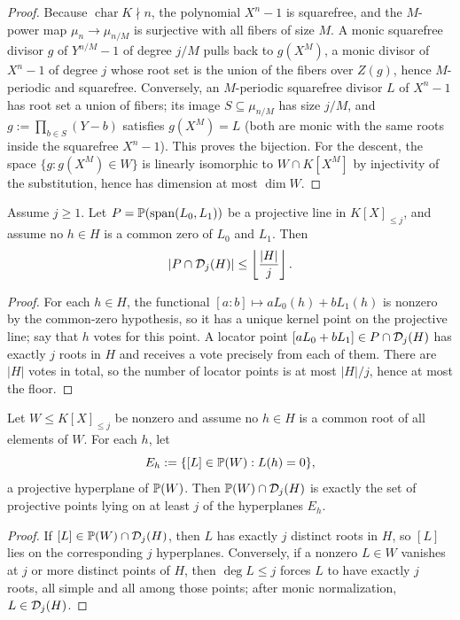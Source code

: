 \begin{proof}
Because $\operatorname{char}K\nmid n$, the polynomial $X^n-1$ is squarefree, and the $M$-power map $\mu_n\to\mu_{n/M}$ is surjective with all fibers of size $M$.  A monic squarefree divisor $g$ of $Y^{n/M}-1$ of degree $j/M$ pulls back to $g(X^M)$, a monic divisor of $X^n-1$ of degree $j$ whose root set is the union of the fibers over $Z(g)$, hence $M$-periodic and squarefree.  Conversely, an $M$-periodic squarefree divisor $L$ of $X^n-1$ has root set a union of fibers; its image $S\subseteq\mu_{n/M}$ has size $j/M$, and $g:=\prod_{b\in S}(Y-b)$ satisfies $g(X^M)=L$ \textup(both are monic with the same roots inside the squarefree $X^n-1$\textup).  This proves the bijection.  For the descent, the space $\{g:g(X^M)\in W\}$ is linearly isomorphic to $W\cap K[X^M]$ by injectivity of the substitution, hence has dimension at most $\dim W$.
\end{proof}

\begin{lemma}\label{lem:v13-dim1}
Assume $j\ge1$.  Let $P=\mathbb P(\operatorname{span}(L_0,L_1))$ be a projective line in $K[X]_{\le j}$, and assume no $h\in H$ is a common zero of $L_0$ and $L_1$.  Then
\[
        |P\cap\mathcal D_j(H)|\le\left\lfloor \frac{|H|}{j}\right\rfloor.
\]
\end{lemma}

\begin{proof}
For each $h\in H$, the functional $[a:b]\mapsto aL_0(h)+bL_1(h)$ is nonzero by the common-zero hypothesis, so it has a unique kernel point on the projective line; say that $h$ votes for this point.  A locator point $[aL_0+bL_1]\in P\cap\mathcal D_j(H)$ has exactly $j$ roots in $H$ and receives a vote precisely from each of them.  There are $|H|$ votes in total, so the number of locator points is at most $|H|/j$, hence at most the floor.
\end{proof}

\begin{lemma}\label{lem:v13-concurrency}
Let $W\le K[X]_{\le j}$ be nonzero and assume no $h\in H$ is a common root of all elements of $W$.  For each $h$, let
\[
        E_h:=\{[L]\in\mathbb P(W):L(h)=0\},
\]
a projective hyperplane of $\mathbb P(W)$.  Then $\mathbb P(W)\cap\mathcal D_j(H)$ is exactly the set of projective points lying on at least $j$ of the hyperplanes $E_h$.
\end{lemma}

\begin{proof}
If $[L]\in\mathbb P(W)\cap\mathcal D_j(H)$, then $L$ has exactly $j$ distinct roots in $H$, so $[L]$ lies on the corresponding $j$ hyperplanes.  Conversely, if a nonzero $L\in W$ vanishes at $j$ or more distinct points of $H$, then $\deg L\le j$ forces $L$ to have exactly $j$ roots, all simple and all among those points; after monic normalization, $L\in\mathcal D_j(H)$.
\end{proof}

